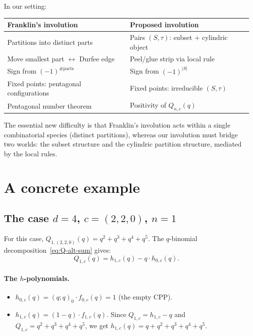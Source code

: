 \documentclass[11pt]{article}
\newcommand{\qpochn}[3]{(#1;#2)_{#3}}
\theoremstyle{plain}
\theoremstyle{definition}
\begin{document}
In our setting:
\begin{center}
\begin{tabular}{l|l}
\textbf{Franklin's involution} & \textbf{Proposed involution} \\ \hline
Partitions into distinct parts &
  Pairs $(S, \tau)$: subset $+$ cylindric object \\
Move smallest part $\leftrightarrow$ Durfee edge &
  Peel/glue strip via local rule \\
Sign from $(-1)^{\text{\#parts}}$ &
  Sign from $(-1)^{|S|}$ \\
Fixed points: pentagonal configurations &
  Fixed points: irreducible $(S, \tau)$ \\
Pentagonal number theorem &
  Positivity of $Q_{n,c}(q)$
\end{tabular}
\end{center}

The essential new difficulty is that Franklin's involution acts
within a single combinatorial species (distinct partitions), whereas
our involution must bridge two worlds: the subset structure and the
cylindric partition structure, mediated by the local rules.


\section{A concrete example}
\label{sec:example}

\subsection{The case $d = 4$, $c = (2,2,0)$, $n = 1$}

For this case, $Q_{1,(2,2,0)}(q) = q^2 + q^3 + q^4 + q^5$.
The $q$-binomial decomposition~\eqref{eq:Q-alt-sum} gives:
\[
  Q_{1,c}(q) = h_{1,c}(q) - q \cdot h_{0,c}(q).
\]

\paragraph{The $h$-polynomials.}
\begin{itemize}
  \item $h_{0,c}(q) = \qpochn{q}{q}{0} \cdot f_{0,c}(q) = 1$
    (the empty CPP).
  \item $h_{1,c}(q) = (1-q) \cdot f_{1,c}(q)$.
    Since $Q_{1,c} = h_{1,c} - q$ and
    $Q_{1,c} = q^2 + q^3 + q^4 + q^5$, we get
    $h_{1,c}(q) = q + q^2 + q^3 + q^4 + q^5$.
\end{itemize}
\end{document}
